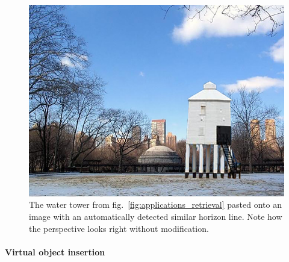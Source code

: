 \begin{figure}[!t]
\centering
\includegraphics[width=0.7\linewidth]{figures/applications/2d_compositing.jpg}
\caption[2D compositing example]{The water tower from fig.~\ref{fig:applications_retrieval} pasted onto an image with an automatically detected similar horizon line. Note how the perspective looks right without modification.\vspace{-0.7em}}
\label{fig:applications_2d_compositing}
\vspace{-0.5em}
\end{figure}

\paragraph{Virtual object insertion}

